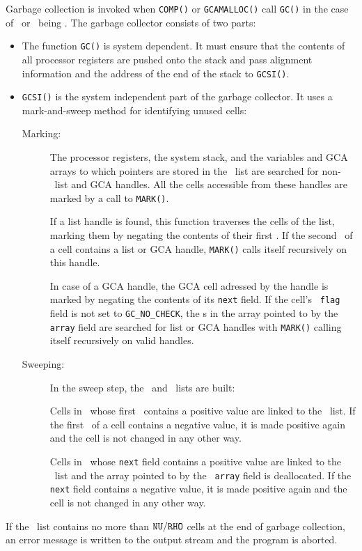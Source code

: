 Garbage collection is invoked when {\tt COMP()} or {\tt GCAMALLOC()} call
{\tt GC()} in the case of \AVAIL\ or \GCAAVAIL\ being \NIL. The garbage
collector consists of two parts:
\begin{itemize}
\item
  The function {\tt GC()} is system dependent. It must ensure that
  the contents of all processor registers are pushed onto the stack and pass
  alignment information and the address of the end of the stack to
  {\tt GCSI()}.
\item
  {\tt GCSI()} is the system independent part of the garbage
  collector. It uses a mark-and-sweep method for identifying unused cells:
  \begin{description}
  \item[Marking:]
    The processor registers, the system stack, and the variables and GCA
    arrays to which pointers are stored in the \GCGLOBALS\ list are
    searched for non-\NIL\ list and GCA handles. All the cells accessible
    from these handles are marked by a call to {\tt MARK()}.

    If a list handle is found, this function traverses the cells of the
    list, marking them by negating the contents of their first \Word. If
    the second \Word\ of a cell contains a list or GCA handle, {\tt MARK()}
    calls itself recursively on this handle.

    In case of a GCA handle, the GCA cell adressed by the handle is marked
    by negating the contents of its {\tt next} field. If the cell's {\tt
    flag} field is not set to {\tt GC\_NO\_CHECK}, the \Word s in the array
    pointed to by the {\tt array} field are searched for list or GCA
    handles with {\tt MARK()} calling itself recursively on valid handles.
  \item[Sweeping:]
    In the sweep step, the \AVAIL\ and \GCAAVAIL\ lists are built:

    Cells in \SPACE\ whose first \Word\ contains a positive value are
    linked to the \AVAIL\ list. If the first \Word\ of a cell contains a
    negative value, it is made positive again and the cell is not changed
    in any other way.

    Cells in \GCASPACE\ whose {\tt next} field contains a positive value
    are linked to the \GCAAVAIL\ list and the array pointed to by the {\tt
    array} field is deallocated. If the {\tt next} field contains a
    negative value, it is made positive again and the cell is not changed
    in any other way.
  \end{description}
\end{itemize}

If the \AVAIL\ list contains no more than ${\tt NU}/{\tt RHO}$ cells at the end of
garbage collection, an error message is written to the output stream and
the program is aborted.


